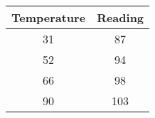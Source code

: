 
\begin{tabular}[]{|c|c|}
\hline
Temperature	& Reading	\\ \hline
  31  & 87  \\ \hline
  52  & 94  \\ \hline
  66  & 98  \\ \hline
  90  & 103  \\ \hline
\end{tabular}